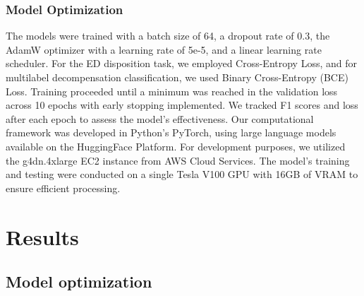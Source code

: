 \documentclass{article}
\theoremstyle{plain}
\theoremstyle{definition}
\theoremstyle{remark}
\begin{document}
\subsubsection{Model Optimization}

The models were trained with a batch size of 64, a dropout rate of 0.3, the AdamW optimizer with a learning rate of 5e-5, and a linear learning rate scheduler. For the ED disposition task, we employed Cross-Entropy Loss, and for multilabel decompensation classification, we used Binary Cross-Entropy (BCE) Loss. Training proceeded until a minimum was reached in the validation loss across 10 epochs with early stopping implemented. We tracked F1 scores and loss after each epoch to assess the model's effectiveness. Our computational framework was developed in Python's PyTorch, using large language models available on the HuggingFace \citep{wolf2019huggingface} Platform. For development purposes, we utilized the g4dn.4xlarge EC2 instance from AWS Cloud Services. The model's training and testing were conducted on a single Tesla V100 GPU with 16GB of VRAM to ensure efficient processing.





\section{Results}


\subsection{Model optimization}

\end{document}
